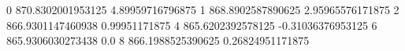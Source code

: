 0 870.8302001953125 4.89959716796875
1 868.8902587890625 2.95965576171875
2 866.9301147460938 0.99951171875
4 865.6202392578125 -0.31036376953125
6 865.9306030273438 0.0
8 866.1988525390625 0.26824951171875
